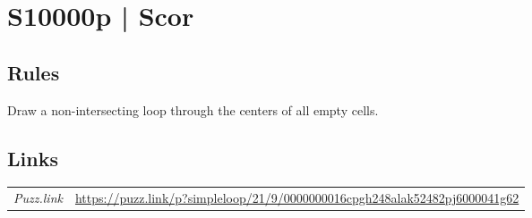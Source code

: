 \section{S10000p | {\normalfont Scor}}
\label{sec:27-s10000p-scor}

\subsection*{Rules}
\begin{markdown}
Draw a non-intersecting loop through the centers of all empty cells.
\end{markdown}
\subsection*{Links}
\begin{tabularx}{\textwidth}{l X}
\emph{Puzz.link} & \url{https://puzz.link/p?simpleloop/21/9/0000000016cpgh248alak52482pj6000041g62} \\
\end{tabularx}
\pagebreak
